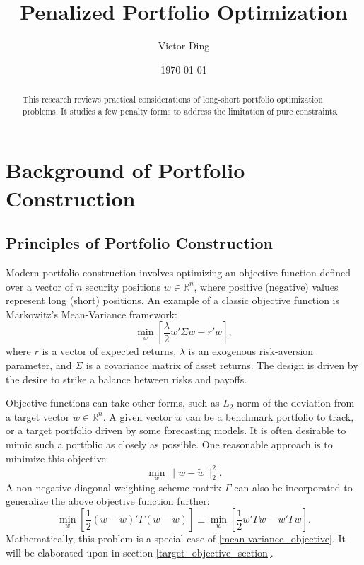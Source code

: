 \documentclass[11pt, letterpaper]{article}
\title{Penalized Portfolio Optimization}
\author{Victor Ding}
\affil{New Canaan High School}
\date{\today}
\begin{document}
\maketitle

\newpage
\setcounter{page}{1} %
\pagestyle{plain}

\begin{abstract}
\noindent
This research reviews practical considerations of long-short portfolio optimization problems. It studies a few penalty forms to
address the limitation of pure constraints.
\end{abstract}
\newpage
\section{Background of Portfolio Construction}

\subsection{Principles of Portfolio Construction}

Modern portfolio construction involves optimizing an objective function defined over a vector of $n$ security positions
$w \in \mathds{R}^n$, where positive (negative) values represent long (short) positions. An example of a classic objective
function is Markowitz's Mean-Variance framework:
\begin{equation}
    \label{mean-variance_objective}
    \underset{w}{\min} \left[\frac{\lambda}{2} w' \Sigma w - r' w\right],
\end{equation}
where $r$ is a vector of expected returns, $\lambda$ is an exogenous risk-aversion parameter, and $\Sigma$ is a covariance
matrix of asset returns. The design is driven by the desire to strike a balance between risks and payoffs.

Objective functions can take other forms, such as $L_2$ norm of the deviation from a target vector $\tilde{w} \in
\mathds{R}^n$. A given vector $\tilde{w}$ can be a benchmark portfolio to track, or a target portfolio driven by some
forecasting models. It is often desirable to mimic such a portfolio as closely as possible. One reasonable approach is to
minimize this objective:
\begin{equation*}
	\underset{w}{\min} \lVert w - \tilde{w}\rVert_2^2.
\end{equation*}
A non-negative diagonal weighting scheme matrix $\Gamma$ can also be incorporated to generalize the above objective function further:
\begin{equation}
  \label{gamma_matrix}
	\underset{w}{\min}\left[\frac{1}{2} (w - \tilde{w})'\Gamma(w - \tilde{w})\right] \equiv
  \underset{w}{\min}\left[\frac{1}{2} w'\Gamma w - \tilde{w}'\Gamma w \right].
\end{equation}
Mathematically, this problem is a special case of \eqref{mean-variance_objective}. It will be elaborated upon in section
\ref{target_objective_section}.
\end{document}
